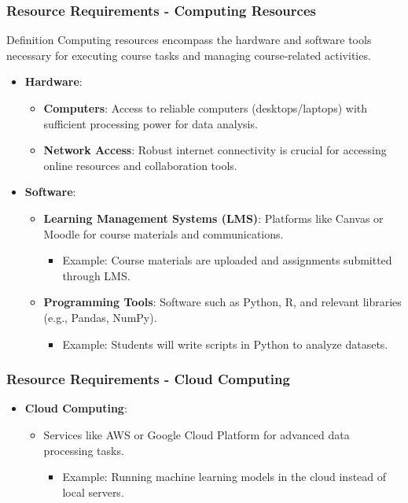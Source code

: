 \documentclass[aspectratio=169]{beamer}
\begin{document}
\begin{frame}[fragile]
    \frametitle{Resource Requirements - Computing Resources}
    \begin{block}{Definition}
        Computing resources encompass the hardware and software tools necessary for executing course tasks and managing course-related activities.
    \end{block}
    \begin{itemize}
        \item \textbf{Hardware}:
        \begin{itemize}
            \item \textbf{Computers}: Access to reliable computers (desktops/laptops) with sufficient processing power for data analysis.
            \item \textbf{Network Access}: Robust internet connectivity is crucial for accessing online resources and collaboration tools.
        \end{itemize}
        
        \item \textbf{Software}:
        \begin{itemize}
            \item \textbf{Learning Management Systems (LMS)}: Platforms like Canvas or Moodle for course materials and communications.
            \begin{itemize}
                \item Example: Course materials are uploaded and assignments submitted through LMS.
            \end{itemize}
            \item \textbf{Programming Tools}: Software such as Python, R, and relevant libraries (e.g., Pandas, NumPy).
            \begin{itemize}
                \item Example: Students will write scripts in Python to analyze datasets.
            \end{itemize}
        \end{itemize}
    \end{itemize}
\end{frame}

\begin{frame}[fragile]
    \frametitle{Resource Requirements - Cloud Computing}
    \begin{itemize}
        \item \textbf{Cloud Computing}:
        \begin{itemize}
            \item Services like AWS or Google Cloud Platform for advanced data processing tasks.
            \begin{itemize}
                \item Example: Running machine learning models in the cloud instead of local servers.
            \end{itemize}
        \end{itemize}
    \end{itemize}
\end{frame}
\end{document}
